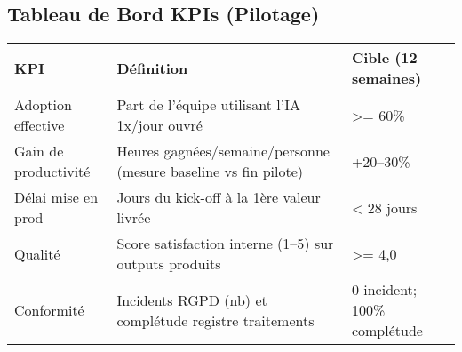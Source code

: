 \subsection{Tableau de Bord KPIs (Pilotage)}
\begin{longtable}{@{}p{5.4cm}p{5.4cm}p{5.4cm}@{}}
\toprule
\textbf{KPI} & \textbf{Définition} & \textbf{Cible (12 semaines)} \\
\midrule
Adoption effective & Part de l’équipe utilisant l’IA 1x/jour ouvré & \textgreater{}= 60\% \\
Gain de productivité & Heures gagnées/semaine/personne (mesure baseline vs fin pilote) & +20–30\% \\
Délai mise en prod & Jours du kick-off à la 1ère valeur livrée & \textless{} 28 jours \\
Qualité & Score satisfaction interne (1–5) sur outputs produits & \textgreater{}= 4{,}0 \\
Conformité & Incidents RGPD (nb) et complétude registre traitements & 0 incident; 100\% complétude \\
\bottomrule
\end{longtable}




